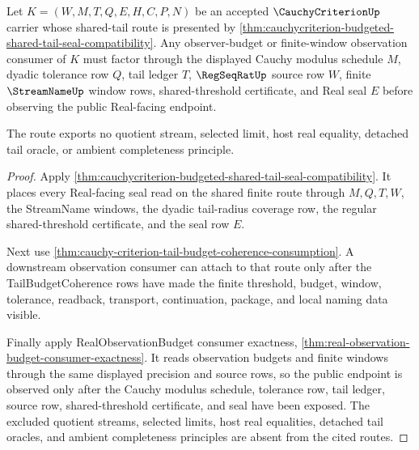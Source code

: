 \begin{theorem}
\label{thm:cauchycriterion-tail-budget-observer-route}
Let $K=(W,M,T,Q,E,H,C,P,N)$ be an accepted $\CauchyCriterionUp$ carrier whose shared-tail route is presented by \autoref{thm:cauchycriterion-budgeted-shared-tail-seal-compatibility}. Any observer-budget or finite-window observation consumer of $K$ must factor through the displayed Cauchy modulus schedule $M$, dyadic tolerance row $Q$, tail ledger $T$, $\RegSeqRatUp$ source row $W$, finite $\StreamNameUp$ window rows, shared-threshold certificate, and Real seal $E$ before observing the public Real-facing endpoint.

The route exports no quotient stream, selected limit, host real equality, detached tail oracle, or ambient completeness principle.
\end{theorem}
\begin{proof}
Apply \autoref{thm:cauchycriterion-budgeted-shared-tail-seal-compatibility}. It places every Real-facing seal read on the shared finite route through $M,Q,T,W$, the StreamName windows, the dyadic tail-radius coverage row, the regular shared-threshold certificate, and the seal row $E$.

Next use \autoref{thm:cauchy-criterion-tail-budget-coherence-consumption}. A downstream observation consumer can attach to that route only after the TailBudgetCoherence rows have made the finite threshold, budget, window, tolerance, readback, transport, continuation, package, and local naming data visible.

Finally apply RealObservationBudget consumer exactness, \autoref{thm:real-observation-budget-consumer-exactness}. It reads observation budgets and finite windows through the same displayed precision and source rows, so the public endpoint is observed only after the Cauchy modulus schedule, tolerance row, tail ledger, source row, shared-threshold certificate, and seal have been exposed. The excluded quotient streams, selected limits, host real equalities, detached tail oracles, and ambient completeness principles are absent from the cited routes.
\end{proof}

